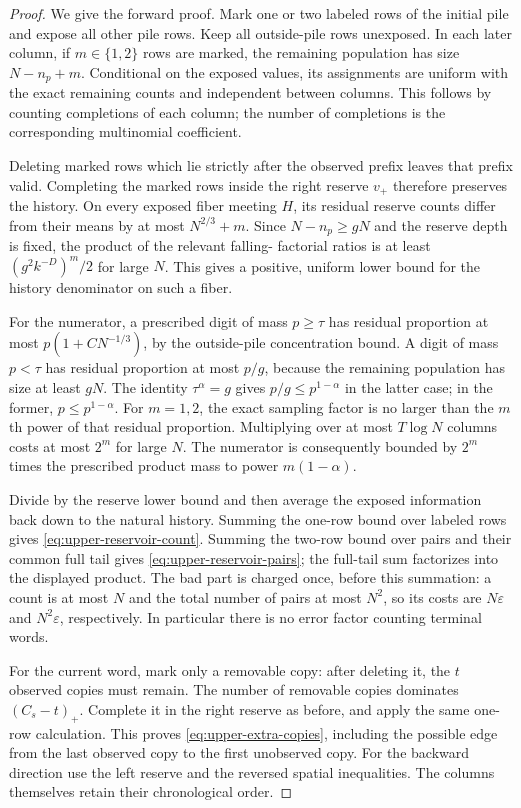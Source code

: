 \begin{proof}
We give the forward proof. Mark one or two labeled rows of the
initial pile and expose all other pile rows. Keep all outside-pile
rows unexposed. In each later column, if $m\in\{1,2\}$ rows are
marked, the remaining population has size $N-n_p+m$. Conditional
on the exposed values, its assignments are uniform with the exact
remaining counts and independent between columns. This follows
by counting completions of each column; the number of completions
is the corresponding multinomial coefficient.

Deleting marked rows which lie strictly after the observed prefix
leaves that prefix valid. Completing the marked rows inside the
right reserve $v_+$ therefore preserves the history. On every
exposed fiber meeting $H$, its residual reserve counts differ from
their means by at most $N^{2/3}+m$. Since $N-n_p\ge gN$ and
the reserve depth is fixed, the product of the relevant falling-
factorial ratios is at least $(g^2k^{-D})^m/2$ for large $N$.
This gives a positive, uniform lower bound for the history denominator
on such a fiber.

For the numerator, a prescribed digit of mass $p\ge\tau$ has
residual proportion at most $p(1+CN^{-1/3})$, by the outside-pile
concentration bound. A digit of mass $p<\tau$ has residual
proportion at most $p/g$, because the remaining population has
size at least $gN$. The identity $\tau^\alpha=g$ gives
$p/g\le p^{1-\alpha}$ in the latter case; in the former,
$p\le p^{1-\alpha}$. For $m=1,2$, the exact sampling factor is
no larger than the $m$th power of that residual proportion.
Multiplying over at most $T\log N$ columns costs at most $2^m$
for large $N$. The numerator is consequently bounded by
$2^m$ times the prescribed product mass to power $m(1-\alpha)$.

Divide by the reserve lower bound and then average the exposed
information back down to the natural history. Summing the one-row
bound over labeled rows gives \eqref{eq:upper-reservoir-count}.
Summing the two-row bound over pairs and their common full tail
gives \eqref{eq:upper-reservoir-pairs}; the full-tail sum factorizes
into the displayed product. The bad part is charged once, before
this summation: a count is at most $N$ and the total number of
pairs at most $N^2$, so its costs are $N\varepsilon$ and
$N^2\varepsilon$, respectively. In particular there is no error
factor counting terminal words.

For the current word, mark only a removable copy: after deleting it,
the $t$ observed copies must remain. The number of removable copies
dominates $(C_s-t)_+$. Complete it in the right reserve as before,
and apply the same one-row calculation. This proves
\eqref{eq:upper-extra-copies}, including the possible edge from the
last observed copy to the first unobserved copy. For the backward
direction use the left reserve and the reversed spatial inequalities.
The columns themselves retain their chronological order.
\end{proof}

